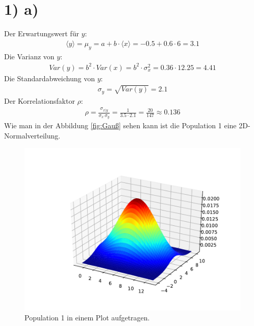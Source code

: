 \section*{1) a)}

Der Erwartungswert für $y$:
\begin{align*}
  \langle y \rangle = \mu_y = a + b\cdot \langle x \rangle = -0.5 + 0.6 \cdot 6 = 3.1
\end{align*}
Die Varianz von $y$:
\begin{align*}
  Var(y) = b^2 \cdot Var(x) = b^2 \cdot \sigma_x^2 = 0.36 \cdot 12.25 = 4.41
\end{align*}
Die Standardabweichung von $y$:
\begin{align*}
  \sigma_y = \sqrt{Var(y)} = 2.1
\end{align*}
Der Korrelationsfaktor $\rho$:
\begin{align*}
  \rho = \frac{\sigma_{x|y}}{\sigma_x\,\sigma_y} = \frac{1}{3.5 \cdot 2.1} = \frac{20}{147} \approx 0.136
\end{align*}
Wie man in der Abbildung \eqref{fig:Gauß} sehen kann ist die Population 1 eine 2D-Normalverteilung.

\begin{figure}[H]
  \includegraphics[width=\linewidth]{Python/Aufgabe1a.pdf}
  \caption{Population 1 in einem Plot aufgetragen.}
  \label{fig:Gauß}
\end{figure}


